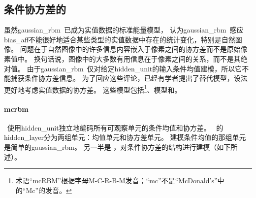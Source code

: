 \subsection{条件协方差的}
\label{sec:undirected_models_of_conditional_covariance}

虽然\gls{gaussian_rbm}~已成为实值数据的标准能量模型， \citet{Ranzato2010a}认为\gls{gaussian_rbm}~感应\gls{bias_aff}不能很好地适合某些类型的实值数据中存在的统计变化，特别是自然图像。
问题在于自然图像中的许多信息内容嵌入于像素之间的协方差而不是原始像素值中。
换句话说，图像中的大多数有用信息在于像素之间的关系，而不是其绝对值。
由于\gls{gaussian_rbm}~仅对给定\gls{hidden_unit}的输入条件均值建模，所以它不能捕获条件协方差信息。
为了回应这些评论，已经有学者提出了替代模型，设法更好地考虑实值数据的协方差。
这些模型包括\footnote{术语``mcRBM''根据字母M-C-R-B-M发音；``mc''不是``McDonald's''中的``Mc''的发音。}、模型和。


\paragraph{\gls{mcrbm}} ~使用\gls{hidden_unit}独立地编码所有可观察单元的条件均值和协方差。
~的\gls{hidden_layer}分为两组单元：均值单元和协方差单元。
建模条件均值的那组单元是简单的\gls{gaussian_rbm}。
另一半是 \citep{Ranzato2010a}，对条件协方差的结构进行建模（如下所述）。


